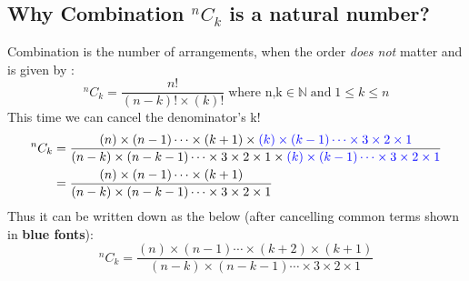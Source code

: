 \documentclass[10pt, twoside]{article}
\newcommand*{\Combination}[2]{{}^{#1}C_{#2}}%
\begin{document}
 	\subsection{Why Combination $\Combination{n}{k}$ is a natural number?}
 	Combination is the number of arrangements, when the order \textit{does not} matter and is given by \cite{PrincTechCombinatorics}:\newline
 	\begin{equation}
 		\Combination{n}{k} = \frac{n!}{(n-k)!\times(k)!} \; \text{where n,k} \in \mathbb{N} \; \text{and} \; 1 \leq k \leq n
 	\end{equation}
 	This time we can cancel the denominator's k!
 	\begin{align*}
 		\Combination{n}{k} &= \frac{(n)\times(n-1)\cdots\times(k+1)\times\color{blue}(k)\times(k-1)\cdots\times3\times2\times1}{(n-k)\times(n-k-1)\cdots\times3\times2\times1\times\color{blue}(k)\times(k-1)\cdots\times3\times2\times1}\\
 		&= \frac{(n)\times(n-1)\cdots\times(k+1)}{(n-k)\times(n-k-1)\cdots\times3\times2\times1}
 	\end{align*}
 Thus it can be written down as the below (after cancelling common terms shown in \textbf{\color{blue}blue fonts}):
 \begin{equation}
 	\Combination{n}{k} = \frac{(n)\times(n-1)\cdots\times(k+2)\times(k+1)}{(n-k)\times(n-k-1)\cdots\times3\times2\times1} \label{reducedCombinationForm}
 \end{equation}
\end{document}
